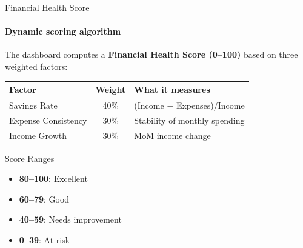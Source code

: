 \documentclass[aspectratio=169, 12pt]{beamer}
\begin{document}
\begin{frame}{Financial Health Score}
\framesubtitle{Dynamic scoring algorithm}
\small
The dashboard computes a \textbf{Financial Health Score (0--100)} based on three weighted factors:

\vspace{6pt}
\begin{center}
\begin{tabular}{@{}l c l@{}}
\toprule
\textbf{Factor} & \textbf{Weight} & \textbf{What it measures} \\
\midrule
Savings Rate & 40\% & (Income $-$ Expenses)/Income \\
Expense Consistency & 30\% & Stability of monthly spending \\
Income Growth & 30\% & MoM income change \\
\bottomrule
\end{tabular}
\end{center}

\vspace{6pt}
\begin{block}{Score Ranges}
\begin{itemize}\itemsep=0pt
    \item \textbf{80--100}: Excellent
    \item \textbf{60--79}: Good
    \item \textbf{40--59}: Needs improvement
    \item \textbf{0--39}: At risk
\end{itemize}
\end{block}
\end{frame}
\end{document}
